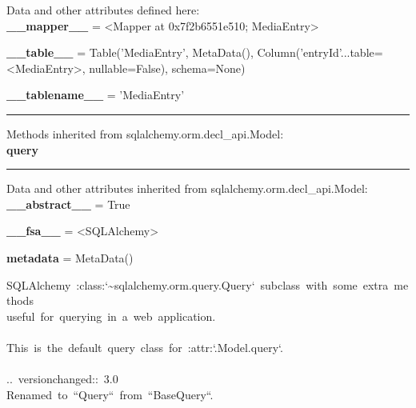 \begin{longtable}[]
\begin{minipage}[t]{\linewidth}
\begin{longtable}[]
\begin{minipage}[t]{\linewidth}
Data and other attributes defined here:\\

\textbf{\_\_mapper\_\_} = \textless Mapper at 0x7f2b6551e510;
MediaEntry\textgreater{}

\textbf{\_\_table\_\_} = Table('MediaEntry', MetaData(),
Column('entryId'...table=\textless MediaEntry\textgreater,
nullable=False), schema=None)

\textbf{\_\_tablename\_\_} = 'MediaEntry'

\begin{center}\rule{0.5\linewidth}{0.5pt}\end{center}

Methods inherited from sqlalchemy.orm.decl\_api.Model:\\

\textbf{query}

\begin{center}\rule{0.5\linewidth}{0.5pt}\end{center}

Data and other attributes inherited from
sqlalchemy.orm.decl\_api.Model:\\

\textbf{\_\_abstract\_\_} = True

\textbf{\_\_fsa\_\_} = \textless SQLAlchemy\textgreater{}

\textbf{metadata} = MetaData()

\begin{description}
\tightlist
\item[\textbf{query\_class} = \textless class
'flask\_sqlalchemy.query.Query'\textgreater{}]
{SQLAlchemy~:class:`\textasciitilde sqlalchemy.orm.query.Query`~subclass~with~some~extra~methods\\
useful~for~querying~in~a~web~application.\\
\hspace*{0.333em}\\
This~is~the~default~query~class~for~:attr:`.Model.query`.\\
\hspace*{0.333em}\\
..~versionchanged::~3.0\\
\hspace*{0.333em}\hspace*{0.333em}\hspace*{0.333em}\hspace*{0.333em}Renamed~to~``Query``~from~``BaseQuery``.}
\end{description}


\end{minipage}
\end{longtable}
\end{minipage}
\end{longtable}
